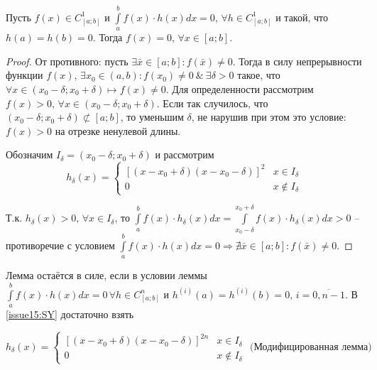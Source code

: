 \begin{lemma}
	Пусть $f(x) \in C^1_{[a;b]}$ и $\int \limits_a^b f(x) \cdot h(x) dx = 0, \, \forall h \in C^1_{[a;b]}$ и такой, что $h(a) = h(b) = 0$. Тогда $f(x) = 0, \, \forall x \in [a;b]$.
\end{lemma}

\begin{proof}
	От противного: пусть $\exists \bar{x} \in [a;b]: f(\bar{x}) \neq 0$. Тогда в силу непрерывности функции $f(x)$, $\exists x_0 \in (a, b): f(x_0) \neq 0 ~\&~ \exists \delta > 0$ такое, что $\forall x \in (x_0 - \delta; x_0 + \delta) \mapsto f(x) \neq 0$. 
    Для определенности рассмотрим $f(x) > 0, \, \forall x \in (x_0 - \delta; x_0 + \delta)$. 
    Если так случилось, что $(x_0 - \delta; x_0 + \delta) \not\subset [a;b]$, то уменьшим $\delta$, не нарушив при этом это условие: $f(x) > 0$ на отрезке ненулевой длины. 

    Обозначим $I_{\delta} = (x_0 - \delta; x_0 + \delta)$ и рассмотрим 
    \begin{equation} \label{issue15:SY}
        h_{\delta}(x) = \begin{cases}
            \left[(x - x_0 + \delta)(x - x_0 - \delta)\right]^2 & x \in I_{\delta}\\
            0 & x \not\in I_{\delta}
            \end{cases}
    \end{equation}
    
    Т.к. $h_{\delta}(x) > 0, \, \forall x \in I_{\delta}$, то $\int \limits_a^b f(x) \cdot h_{\delta}(x) dx  = \int \limits_{x_0 - \delta}^{x_0 + \delta} f(x) \cdot h_{\delta}(x) dx > 0$ 
    -- противоречие с условием $\int \limits_a^b f(x) \cdot h(x) dx = 0  \Rightarrow \nexists \bar{x} \in [a;b]: f(\bar{x}) \neq 0$. 
\end{proof}

    \begin{remark}
    	
    	Лемма остаётся в силе, если в условии леммы $\int \limits_a^b f(x) \cdot h(x) dx = 0 \, \forall h \in C^n_{[a;b]}$ и $h^{(i)}(a) = h^{(i)}(b) = 0, \, i = \overline{0, n-1}$. В \eqref{issue15:SY} достаточно взять 
    	
    	\begin{equation} \label{issue15:SY}
    		h_{\delta}(x) = \begin{cases}
    			\left[(x - x_0 + \delta)(x - x_0 - \delta)\right]^{2n} & x \in I_{\delta}\\
    			0 & x \not\in I_{\delta}
    		\end{cases} 
    		\text{  (Модифицированная лемма)}
    	\end{equation}
    \end{remark}
    
